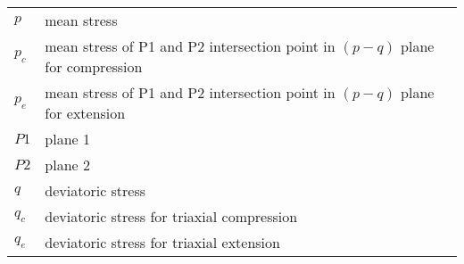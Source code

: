 \begin{table}[h]
\begin{tabular}{ll}
        $p$ & mean stress\\
        $p_c$ & mean stress of P1 and P2 intersection point in $(p-q)$ plane for compression \\
        $p_e$ & mean stress of P1 and P2 intersection point in $(p-q)$ plane for extension \\  
        $P1$ & plane 1 \\
        $P2$ & plane 2 \\
        $q$ & deviatoric stress \\
        $q_c$ & deviatoric stress for triaxial compression \\
        $q_e$ & deviatoric stress for triaxial extension \\
    \end{tabular}
\end{table}

